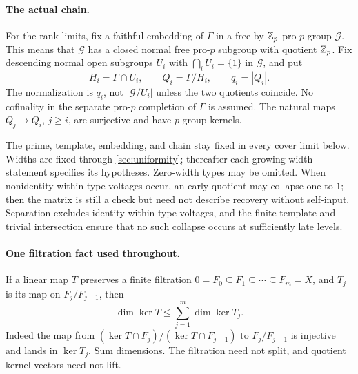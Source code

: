 \paragraph{The actual chain.}
For the rank limits, fix a faithful embedding of $\Gamma$ in a
free-by-$\mathbb{Z}_p$ pro-$p$ group $\mathcal G$. This means that
$\mathcal G$ has a closed normal free pro-$p$ subgroup with quotient
$\mathbb{Z}_p$. Fix descending normal open subgroups $U_i$ with
$\bigcap_iU_i=\{1\}$ in $\mathcal G$, and put
\begin{equation}\label{eq:chain}
 H_i=\Gamma\cap U_i,\qquad Q_i=\Gamma/H_i,\qquad q_i=|Q_i|.
\end{equation}
The normalization is $q_i$, not $|\mathcal G/U_i|$ unless the two
quotients coincide. No cofinality in the separate pro-$p$ completion
of $\Gamma$ is assumed. The natural maps $Q_j\to Q_i$, $j\ge i$,
are surjective and have $p$-group kernels.

The prime, template, embedding, and chain stay fixed in every cover
limit below. Widths are fixed through \cref{sec:uniformity}; thereafter
each growing-width statement specifies its hypotheses.
Zero-width types may be omitted. When nonidentity within-type voltages
occur, an early quotient may collapse one to $1$; then the matrix is
still a check but need not describe recovery without self-input.
Separation excludes identity within-type voltages, and the finite
template and trivial intersection ensure that no such collapse occurs
at sufficiently late levels.

\paragraph{One filtration fact used throughout.}
If a linear map $T$ preserves a finite filtration
$0=F_0\subseteq F_1\subseteq\cdots\subseteq F_m=X$, and $T_j$ is its
map on $F_j/F_{j-1}$, then
\begin{equation}\label{eq:filtered-kernel}
 \dim\ker T\le\sum_{j=1}^m\dim\ker T_j.
\end{equation}
Indeed the map from
$(\ker T\cap F_j)/(\ker T\cap F_{j-1})$ to $F_j/F_{j-1}$
is injective and lands in $\ker T_j$. Sum dimensions.
The filtration need not split, and quotient kernel vectors need not lift.
